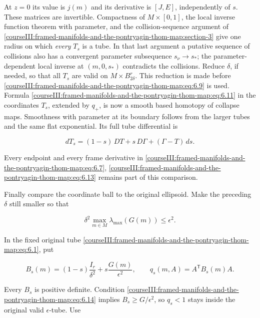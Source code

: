At \(z=0\) its value is \(j(m)\) and its derivative is \([J,E]\), independently of \(s\). These matrices are invertible. Compactness of \(M\times[0,1]\), the local inverse function theorem with parameter, and the collision-sequence argument of \cref{courseIII:framed-manifolds-and-the-pontryagin-thom-map:section-3} give one radius on which \emph{every} \(T_s\) is a tube. In that last argument a putative sequence of collisions also has a convergent parameter subsequence \(s_\nu\to s_*\); the parameter-dependent local inverse at \((m,0,s_*)\) contradicts the collisions. Reduce \(\delta\), if needed, so that all \(T_s\) are valid on \(M\times B_{2\delta}^r\). This reduction is made before \eqref{courseIII:framed-manifolds-and-the-pontryagin-thom-map:eq:6.9} is used. Formula \eqref{courseIII:framed-manifolds-and-the-pontryagin-thom-map:eq:6.11} in the coordinates \(T_s\), extended by \(q_+\), is now a smooth based homotopy of collapse maps. Smoothness with parameter at its boundary follows from the larger tubes and the same flat exponential. Its full tube differential is

\begin{equation}
dT_s=(1-s)\,DT+s\,D\Gamma+(\Gamma-T)\,ds.
 \label{courseIII:framed-manifolds-and-the-pontryagin-thom-map:eq:6.13}
\end{equation}

Every endpoint and every frame derivative in \eqref{courseIII:framed-manifolds-and-the-pontryagin-thom-map:eq:6.7}, \eqref{courseIII:framed-manifolds-and-the-pontryagin-thom-map:eq:6.13} remains part of this comparison.

Finally compare the coordinate ball to the original ellipsoid. Make the preceding \(\delta\) still smaller so that

\begin{equation}
\delta^2\max_{m\in M}\lambda_{\max}(G(m))\leq\epsilon^2.
 \label{courseIII:framed-manifolds-and-the-pontryagin-thom-map:eq:6.14}
\end{equation}

In the fixed original tube \eqref{courseIII:framed-manifolds-and-the-pontryagin-thom-map:eq:6.1}, put

\begin{equation}
B_s(m)=(1-s)\frac{I_r}{\delta^2}
                         +s\frac{G(m)}{\epsilon^2},
 \qquad q_s(m,A)=A^{\mathsf T}B_s(m)A.
 \label{courseIII:framed-manifolds-and-the-pontryagin-thom-map:eq:6.15}
\end{equation}

Every \(B_s\) is positive definite. Condition \eqref{courseIII:framed-manifolds-and-the-pontryagin-thom-map:eq:6.14} implies
\(B_s\geq G/\epsilon^2\), so \(q_s<1\) stays inside the original valid \(\epsilon\)-tube. Use

